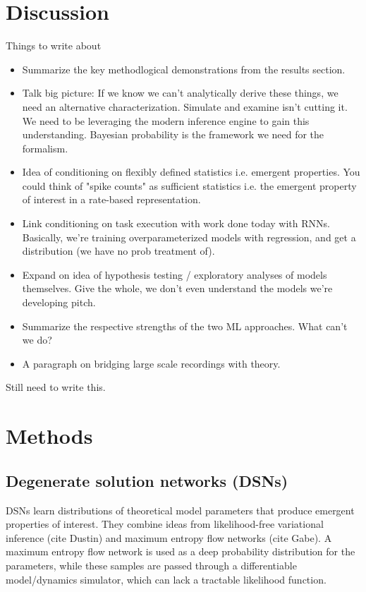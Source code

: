 \documentclass[11pt]{article}
\begin{document}
\section{Discussion}
Things to write about
\begin{itemize}
\item Summarize the key methodlogical demonstrations from the results section.
\item Talk big picture: If we know we can't analytically derive these things, we need an alternative characterization.  Simulate and examine isn't cutting it.  We need to be leveraging the modern inference engine to gain this understanding.  Bayesian probability is the framework we need for the formalism.
\item Idea of conditioning on flexibly defined statistics i.e. emergent properties.  You could think of "spike counts" as sufficient statistics i.e. the emergent property of interest in a rate-based representation.
\item Link conditioning on task execution with work done today with RNNs.  Basically, we're training overparameterized models with regression, and get a distribution (we have no prob treatment of).
\item Expand on idea of hypothesis testing / exploratory analyses of models themselves.  Give the whole, we don't even understand the models we're developing pitch.
\item Summarize the respective strengths of the two ML approaches.  What can't we do?
\item A paragraph on bridging large scale recordings with theory.
\end{itemize}
Still need to write this.




\appendix

\section{Methods}
\subsection{Degenerate solution networks (DSNs)}
DSNs learn distributions of theoretical model parameters that produce emergent properties of interest.  They combine ideas from likelihood-free variational inference (cite Dustin) and maximum entropy flow networks (cite Gabe).  A maximum entropy flow network is used as a deep probability distribution for the parameters, while these samples are passed through a differentiable model/dynamics simulator, which can lack a tractable likelihood function.
\end{document}
